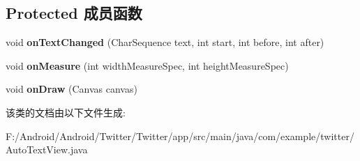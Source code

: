 \subsection*{Protected 成员函数}
\begin{DoxyCompactItemize}
\item 
\mbox{\label{classcom_1_1example_1_1twitter_1_1_auto_text_view_a1d07ef79d77bfa14ca4cdfb04cb5caad}} 
void {\bfseries on\+Text\+Changed} (Char\+Sequence text, int start, int before, int after)
\item 
\mbox{\label{classcom_1_1example_1_1twitter_1_1_auto_text_view_a4d4068da16e594801d42ee7569fdfc77}} 
void {\bfseries on\+Measure} (int width\+Measure\+Spec, int height\+Measure\+Spec)
\item 
\mbox{\label{classcom_1_1example_1_1twitter_1_1_auto_text_view_a1405881df4e30d4be71298fbbd5455f4}} 
void {\bfseries on\+Draw} (Canvas canvas)
\end{DoxyCompactItemize}


该类的文档由以下文件生成\+:\begin{DoxyCompactItemize}
\item 
F\+:/\+Android/\+Android/\+Twitter/\+Twitter/app/src/main/java/com/example/twitter/Auto\+Text\+View.\+java\end{DoxyCompactItemize}
